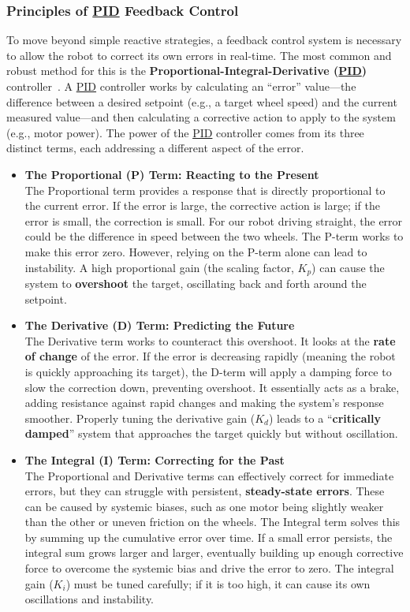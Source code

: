 \subsubsection{Principles of \texorpdfstring{\hyperref[term:pid]{PID}}{PID} Feedback Control}
\label{subsubsec:pid_principles}
To move beyond simple reactive strategies, a feedback control system is necessary to allow the robot to correct its own errors in real-time. The most common and robust method for this is the \textbf{Proportional-Integral-Derivative (\hyperref[term:pid]{PID})} controller~\cite{AerospaceControlsLab2016PID}. A \hyperref[term:pid]{PID} controller works by calculating an ``error'' value---the difference between a desired setpoint (e.g., a target wheel speed) and the current measured value---and then calculating a corrective action to apply to the system (e.g., motor power). The power of the \hyperref[term:pid]{PID} controller comes from its three distinct terms, each addressing a different aspect of the error.
\begin{itemize}
    \item \textbf{The Proportional (P) Term: Reacting to the Present}\\
    The Proportional term provides a response that is directly proportional to the current error. If the error is large, the corrective action is large; if the error is small, the correction is small. For our robot driving straight, the error could be the difference in speed between the two wheels. The P-term works to make this error zero. However, relying on the P-term alone can lead to instability. A high proportional gain (the scaling factor, $K_p$) can cause the system to \textbf{overshoot} the target, oscillating back and forth around the setpoint.
    \item \textbf{The Derivative (D) Term: Predicting the Future}\\
    The Derivative term works to counteract this overshoot. It looks at the \textbf{rate of change} of the error. If the error is decreasing rapidly (meaning the robot is quickly approaching its target), the D-term will apply a damping force to slow the correction down, preventing overshoot. It essentially acts as a brake, adding resistance against rapid changes and making the system's response smoother. Properly tuning the derivative gain ($K_d$) leads to a ``\textbf{critically damped}'' system that approaches the target quickly but without oscillation.
    \item \textbf{The Integral (I) Term: Correcting for the Past}\\
    The Proportional and Derivative terms can effectively correct for immediate errors, but they can struggle with persistent, \textbf{steady-state errors}. These can be caused by systemic biases, such as one motor being slightly weaker than the other or uneven friction on the wheels. The Integral term solves this by summing up the cumulative error over time. If a small error persists, the integral sum grows larger and larger, eventually building up enough corrective force to overcome the systemic bias and drive the error to zero. The integral gain ($K_i$) must be tuned carefully; if it is too high, it can cause its own oscillations and instability.
\end{itemize}
